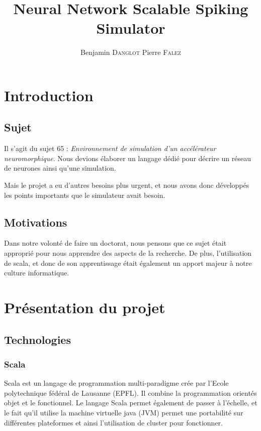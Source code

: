 \documentclass{article}
\author{Benjamin \textsc{Danglot} Pierre \textsc{Falez}}
\title{Neural Network Scalable Spiking Simulator}
\begin{document}

\maketitle

\newpage


\tableofcontents

\newpage


\section*{Introduction}

\subsection*{Sujet} 
    Il s’agit du sujet 65 : \emph{Environnement de simulation d'un accélérateur neuromorphique}. Nous devions élaborer un langage dédié pour décrire un réseau de neurones ainsi qu’une simulation.

Mais le projet a eu d’autres besoins plus urgent, et nous avons donc développés les points importants que le simulateur avait besoin.

\subsection*{Motivations}
    Dans notre volonté de faire un doctorat, nous pensons que ce sujet était approprié pour nous apprendre des aspects de la recherche. De plus, l’utilisation de scala, et donc de son apprentissage était également un apport majeur à notre culture informatique. 
		

\newpage

\section{Présentation du projet}

\subsection{Technologies}
        \subsubsection{Scala} Scala est un langage de programmation multi-paradigme crée par l’Ecole polytechnique fédéral de Lausanne (EPFL). Il combine la programmation orientés objet et le fonctionnel. Le langage Scala permet également de passer à l’échelle, et le fait qu’il utilise la machine virtuelle java (JVM) permet une portabilité sur différentes plateformes et ainsi l’utilisation de cluster pour fonctionner.
\end{document}
